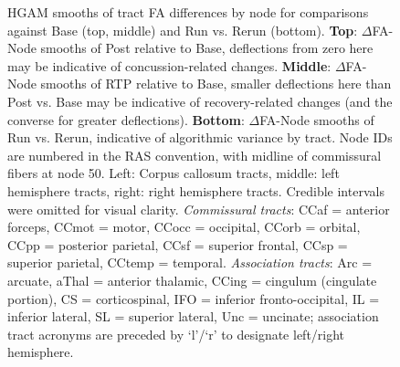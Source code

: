 \documentclass[12pt]{article}
\begin{document}
\begin{figure}[H]
	\centering
	\caption{HGAM smooths of tract FA differences by node for comparisons against Base (top, middle) and Run vs. Rerun (bottom). \textbf{Top}: $\Delta$FA-Node smooths of Post relative to Base, deflections from zero here may be indicative of concussion-related changes. \textbf{Middle}: $\Delta$FA-Node smooths of RTP relative to Base, smaller deflections here than Post vs. Base may be indicative of recovery-related changes (and the converse for greater deflections). \textbf{Bottom}: $\Delta$FA-Node smooths of Run vs. Rerun, indicative of algorithmic variance by tract. Node IDs are numbered in the RAS convention, with midline of commissural fibers at node 50. Left: Corpus callosum tracts, middle: left hemisphere tracts, right: right hemisphere tracts. Credible intervals were omitted for visual clarity. \textit{Commissural tracts}: CCaf = anterior forceps, CCmot = motor, CCocc = occipital, CCorb = orbital, CCpp = posterior parietal, CCsf = superior frontal, CCsp = superior parietal, CCtemp = temporal. \textit{Association tracts}: Arc = arcuate, aThal = anterior thalamic, CCing = cingulum (cingulate portion), CS = corticospinal, IFO = inferior fronto-occipital, IL = inferior lateral, SL = superior lateral, Unc = uncinate; association tract acronyms are preceded by `l'/`r' to designate left/right hemisphere.}
	\label{fig:ldi-gam}
\end{figure}
\end{document}
